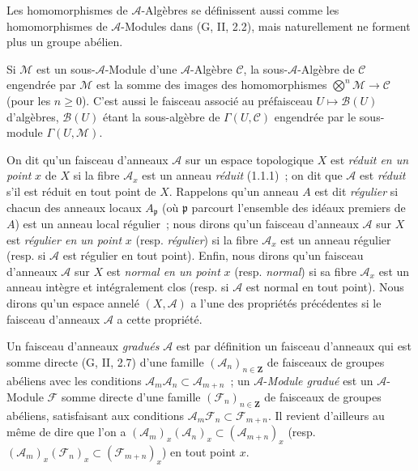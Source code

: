 \begin{env}[4.1.3]
Les homomorphismes de $\mathcal{A}$-Algèbres se définissent aussi comme les
homomorphismes de $\mathcal{A}$-Modules dans (G, II, 2.2), mais naturellement
ne forment plus un groupe abélien.

Si $\mathcal{M}$ est un sous-$\mathcal{A}$-Module d'une
$\mathcal{A}$-Algèbre $\mathcal{C}$, la sous-$\mathcal{A}$-Algèbre de
$\mathcal{C}$ engendrée par $\mathcal{M}$ est la somme des images des
homomorphismes $\bigotimes^n\mathcal{M}\to\mathcal{C}$ (pour les
$n\geqslant 0$). C'est aussi le faisceau associé au préfaisceau
$U\mapsto\mathcal{B}(U)$ d'algèbres, $\mathcal{B}(U)$ étant la sous-algèbre
de $\Gamma(U,\mathcal{C})$ engendrée par le sous-module
$\Gamma(U,\mathcal{M})$.
\end{env}

\begin{env}[4.1.4]
\label{0.4.1.4-fr}
On dit qu'un faisceau d'anneaux $\mathcal{A}$ sur un espace topologique $X$
est \emph{réduit en un point} $x$ de $X$ si la fibre $\mathcal{A}_x$ est un
anneau \emph{réduit} (1.1.1)~; on dit que $\mathcal{A}$ est \emph{réduit}
s'il est réduit en tout point de $X$. Rappelons qu'un anneau $A$ est dit
\emph{régulier} si chacun des anneaux locaux $A_{\mathfrak p}$ (où
$\mathfrak p$ parcourt l'ensemble des idéaux premiers de $A$) est un anneau
local régulier~; nous dirons qu'un faisceau d'anneaux $\mathcal{A}$ sur $X$
est \emph{régulier en un point} $x$ (resp. \emph{régulier}) si la fibre
$\mathcal{A}_x$ est un anneau régulier (resp. si $\mathcal{A}$ est régulier
en tout point). Enfin, nous dirons qu'un faisceau d'anneaux $\mathcal{A}$ sur
$X$ est \emph{normal en un point} $x$ (resp. \emph{normal}) si sa fibre
$\mathcal{A}_x$ est un anneau intègre et intégralement clos (resp. si
$\mathcal{A}$ est normal en tout point). Nous dirons qu'un espace annelé
$(X,\mathcal{A})$ a l'une des propriétés précédentes si le faisceau d'anneaux
$\mathcal{A}$ a cette propriété.

Un faisceau d'anneaux \emph{gradués} $\mathcal{A}$ est par définition un
faisceau d'anneaux qui est somme directe (G, II, 2.7) d'une famille
$(\mathcal{A}_n)_{n\in\mathbf Z}$ de faisceaux de groupes abéliens avec les
conditions $\mathcal{A}_m\mathcal{A}_n\subset\mathcal{A}_{m+n}$~; un
$\mathcal{A}$-\emph{Module gradué} est un $\mathcal{A}$-Module
$\mathcal{F}$ somme directe d'une famille
$(\mathcal{F}_n)_{n\in\mathbf Z}$ de faisceaux de groupes abéliens,
satisfaisant aux conditions
$\mathcal{A}_m\mathcal{F}_n\subset\mathcal{F}_{m+n}$. Il revient d'ailleurs
au même de dire que l'on a
$(\mathcal{A}_m)_x(\mathcal{A}_n)_x\subset(\mathcal{A}_{m+n})_x$
(resp.
$(\mathcal{A}_m)_x(\mathcal{F}_n)_x\subset(\mathcal{F}_{m+n})_x$)
en tout point $x$.
\end{env}

